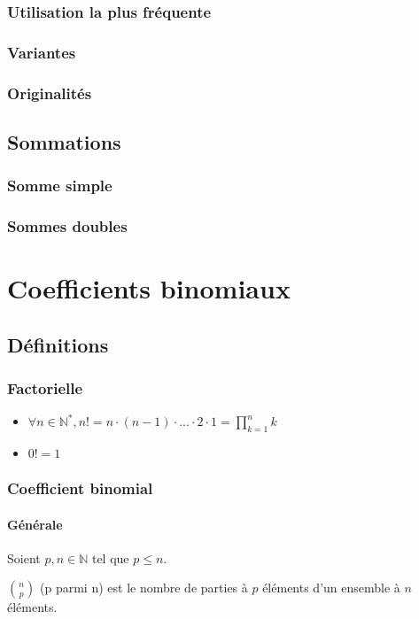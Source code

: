 \documentclass[12pt,a4paper,french]{book}
\begin{document}
		\subsection{Utilisation la plus fréquente}
		\subsection{Variantes}
		\subsection{Originalités}
	\section{Sommations}
		\subsection{Somme simple}
		\subsection{Sommes doubles}
		
\chapter{Coefficients binomiaux}
	\section{Définitions}
		\subsection{Factorielle}
		\begin{itemize}
			\item $\forall n \in \mathbb{N}^{\ast}, n! = n\cdot(n-1)\cdot...\cdot2\cdot1 = \prod_{k=1}^{n}k$
			\item $0! = 1$
		\end{itemize}
		\subsection{Coefficient binomial}
			\subsubsection{Générale}
			Soient $p,n \in \mathbb{N}$ tel que $p\leqslant n$.
			
			$\binom{n}{p}$ (p parmi n) est le nombre de parties à $p$ éléments d'un ensemble à $n$ éléments.
\end{document}
